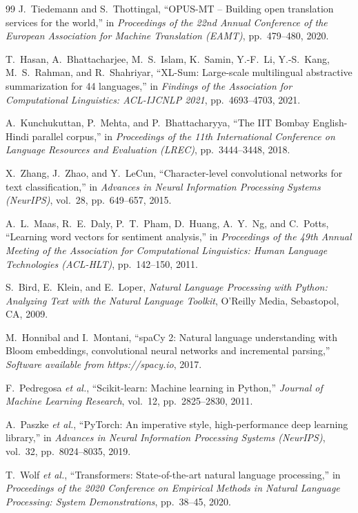 \documentclass[12pt,a4paper]{report}
\begin{document}
\begin{thebibliography}{99}
J.~Tiedemann and S.~Thottingal,
``OPUS-MT -- Building open translation services for the world,''
in \emph{Proceedings of the 22nd Annual Conference of the European Association for Machine Translation (EAMT)}, pp.~479--480, 2020.

T.~Hasan, A.~Bhattacharjee, M.~S.~Islam, K.~Samin, Y.-F.~Li, Y.-S.~Kang, M.~S.~Rahman, and R.~Shahriyar,
``XL-Sum: Large-scale multilingual abstractive summarization for 44 languages,''
in \emph{Findings of the Association for Computational Linguistics: ACL-IJCNLP 2021}, pp.~4693--4703, 2021.

A.~Kunchukuttan, P.~Mehta, and P.~Bhattacharyya,
``The IIT Bombay English-Hindi parallel corpus,''
in \emph{Proceedings of the 11th International Conference on Language Resources and Evaluation (LREC)}, pp.~3444--3448, 2018.

X.~Zhang, J.~Zhao, and Y.~LeCun,
``Character-level convolutional networks for text classification,''
in \emph{Advances in Neural Information Processing Systems (NeurIPS)}, vol.~28, pp.~649--657, 2015.

A.~L.~Maas, R.~E.~Daly, P.~T.~Pham, D.~Huang, A.~Y.~Ng, and C.~Potts,
``Learning word vectors for sentiment analysis,''
in \emph{Proceedings of the 49th Annual Meeting of the Association for Computational Linguistics: Human Language Technologies (ACL-HLT)}, pp.~142--150, 2011.

S.~Bird, E.~Klein, and E.~Loper,
\emph{Natural Language Processing with Python: Analyzing Text with the Natural Language Toolkit},
O'Reilly Media, Sebastopol, CA, 2009.

M.~Honnibal and I.~Montani,
``spaCy 2: Natural language understanding with Bloom embeddings, convolutional neural networks and incremental parsing,''
\emph{Software available from https://spacy.io}, 2017.

F.~Pedregosa \emph{et al.},
``Scikit-learn: Machine learning in Python,''
\emph{Journal of Machine Learning Research}, vol.~12, pp.~2825--2830, 2011.

A.~Paszke \emph{et al.},
``PyTorch: An imperative style, high-performance deep learning library,''
in \emph{Advances in Neural Information Processing Systems (NeurIPS)}, vol.~32, pp.~8024--8035, 2019.

T.~Wolf \emph{et al.},
``Transformers: State-of-the-art natural language processing,''
in \emph{Proceedings of the 2020 Conference on Empirical Methods in Natural Language Processing: System Demonstrations}, pp.~38--45, 2020.


\end{thebibliography}
\end{document}
